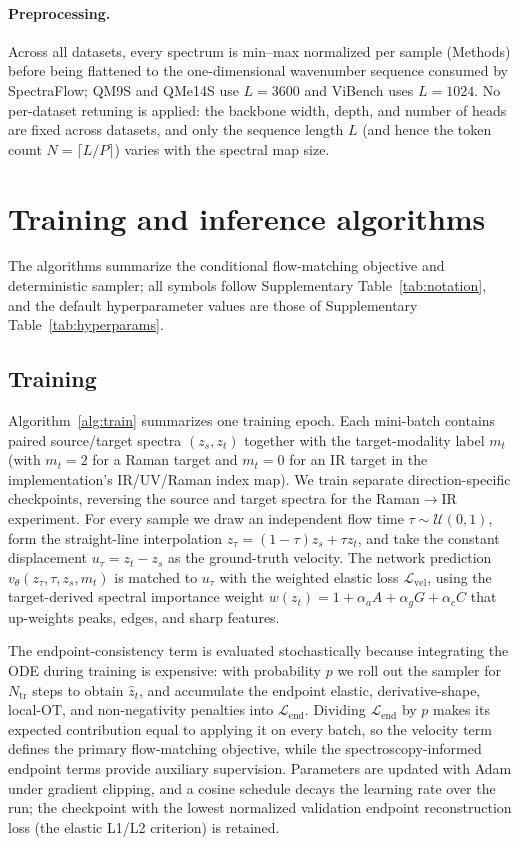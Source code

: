 \documentclass[pdflatex,sn-mathphys-num]{sn-jnl}%
\newcommand{\mname}{SpectraFlow}
\theoremstyle{thmstyleone}%
\theoremstyle{thmstyletwo}%
\theoremstyle{thmstylethree}%
\begin{document}
\begin{appendices}
\paragraph{Preprocessing.} Across all datasets, every spectrum is min--max normalized per sample (Methods) before being flattened to the one-dimensional wavenumber sequence consumed by \mname; QM9S and QMe14S use $L{=}3600$ and ViBench uses $L{=}1024$. No per-dataset retuning is applied: the backbone width, depth, and number of heads are fixed across datasets, and only the sequence length $L$ (and hence the token count $N{=}\lceil L/P\rceil$) varies with the spectral map size.

\section{Training and inference algorithms}\label{app:algo}

The algorithms summarize the conditional flow-matching objective and deterministic sampler; all symbols follow Supplementary Table~\ref{tab:notation}, and the default hyperparameter values are those of Supplementary Table~\ref{tab:hyperparams}.

\subsection{Training}
Algorithm~\ref{alg:train} summarizes one training epoch. Each mini-batch contains paired source/target spectra $(z_s,z_t)$ together with the target-modality label $m_t$ (with $m_t{=}2$ for a Raman target and $m_t{=}0$ for an IR target in the implementation's IR/UV/Raman index map). We train separate direction-specific checkpoints, reversing the source and target spectra for the Raman$\rightarrow$IR experiment. For every sample we draw an independent flow time $\tau\sim\mathcal{U}(0,1)$, form the straight-line interpolation $z_\tau=(1-\tau)z_s+\tau z_t$, and take the constant displacement $u_\tau=z_t-z_s$ as the ground-truth velocity. The network prediction $v_\theta(z_\tau,\tau,z_s,m_t)$ is matched to $u_\tau$ with the weighted elastic loss $\mathcal{L}_{\mathrm{vel}}$, using the target-derived spectral importance weight $w(z_t)=1+\alpha_a A+\alpha_g G+\alpha_c C$ that up-weights peaks, edges, and sharp features.

The endpoint-consistency term is evaluated stochastically because integrating the ODE during training is expensive: with probability $p$ we roll out the sampler for $N_{\mathrm{tr}}$ steps to obtain $\hat z_t$, and accumulate the endpoint elastic, derivative-shape, local-OT, and non-negativity penalties into $\mathcal{L}_{\mathrm{end}}$. Dividing $\mathcal{L}_{\mathrm{end}}$ by $p$ makes its expected contribution equal to applying it on every batch, so the velocity term defines the primary flow-matching objective, while the spectroscopy-informed endpoint terms provide auxiliary supervision.  Parameters are updated with Adam under gradient clipping, and a cosine schedule decays the learning rate over the run; the checkpoint with the lowest normalized validation endpoint reconstruction loss (the elastic L1/L2 criterion) is retained.


\end{appendices}
\end{document}
